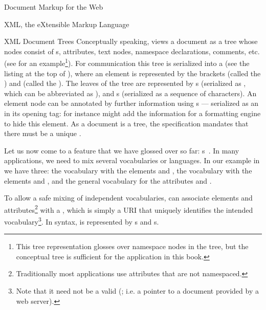 \begin{tchapter}[id=markup-web]{Document Markup for the Web}
\begin{tsection}[id=xml]{XML, the eXtensible Markup Language}
\begin{tsubsection}[id=xml-tree,short=XML Documents as Trees]{XML Document Trees}
Conceptually speaking, {\xml} views a document as a tree whose nodes
consist of {s}, attributes, text nodes, namespace declarations, {\xml}
comments, etc. (see {} for an example\footnote{This tree representation
  glosses over namespace nodes in the tree, but the conceptual tree is sufficient for the
  application in this book.}). For communication this tree is serialized into a
{} (see the listing at the top of
{}), where an element {} is represented by the brackets
{} (called the {}) and {} (called the
{}). The leaves of the tree are represented by {s} (serialized
as {}, which can be abbreviated as {}), and
{s} (serialized as a sequence of {\unicode} characters).  An element
node can be annotated by further information using {s} ---
serialized as an {} in its opening tag: for instance 
{} might add the information for a formatting engine to hide this
element. As a document is a tree, the {\xml} specification mandates that there must be a
unique {}.

Let us now come to a feature that we have glossed over so far: {\xml}
{s}~\cite{BraHol:xmlns99}. In many {\xml} applications, we need to mix
several {\xml} vocabularies or languages. In our example in {} we have
three: the {\omdoc} vocabulary with the elements {} and {},
the {\openmath} vocabulary with the elements {} and
{}, and the general {\xml} vocabulary for the attributes
{} and {}.

To allow a safe mixing of independent {\xml} vocabularies, {\xml} can associate
elements and attributes\footnote{Traditionally most {\xml} applications use attributes
  that are not namespaced.} with a {}, which is
simply a URI that uniquely identifies the intended vocabulary\footnote{Note that it need
  not be a valid {} ({}; i.e.  a
  pointer to a document provided by a web server).}.  In {\xml} syntax,
{} is represented by {s}
and {s}.


\end{tsubsection}
\end{tsection}
\end{tchapter}
